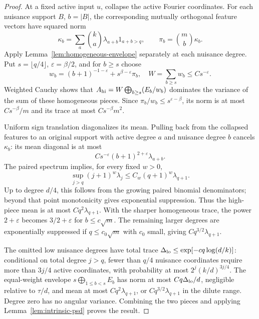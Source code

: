 \begin{proof}
At a fixed active input $u$, collapse the active Fourier coordinates.
For each nuisance support $B$, $b=|B|$, the corresponding mutually
orthogonal feature vectors have squared norm
\[
 \kappa_b=\sum_a\binom ka\lambda_{a+b}1_{a+b>q},
 \qquad \pi_b=\binom mb\kappa_b.
\]
Apply Lemma~\ref{lem:homogeneous-envelope} separately at each nuisance
degree. Put $s=\lfloor q/4\rfloor$, $\varepsilon=\beta/2$, and for
$b\ge s$ choose
\[
 w_b=(b+1)^{-1-\varepsilon}+s^{\beta-\varepsilon}\pi_b,
 \quad W=\sum_{b\ge s}w_b\le Cs^{-\varepsilon}.
\]
Weighted Cauchy shows that
$A_{\rm hi}=W\bigoplus_{b\ge s}(E_b/w_b)$ dominates the variance of
the sum of these homogeneous pieces. Since
$\pi_b/w_b\le s^{\varepsilon-\beta}$, its norm is at most
$Cs^{-\beta}/m$ and its trace at most $Cs^{-\beta}m^2$.

Uniform sign translation diagonalizes its mean. Pulling back from the
collapsed features to an original support with active degree $a$ and
nuisance degree $b$ cancels $\kappa_b$: its mean diagonal is at most
\[
 Cs^{-\varepsilon}(b+1)^{2+\varepsilon}\lambda_{a+b}.
\]
The paired spectrum implies, for every fixed $w>0$,
\[
 \sup_{j>q}(j+1)^w\lambda_j
     \le C_w(q+1)^w\lambda_{q+1}.
\]
Up to degree $d/4$, this follows from the growing paired binomial
denominators; beyond that point monotonicity gives exponential
suppression. Thus the high-piece mean is at most $Cq^2\lambda_{q+1}$.
With the sharper homogeneous trace, the power $2+\varepsilon$ becomes
$3/2+\varepsilon$ for $b\le c\sqrt m$. The remaining larger degrees
are exponentially suppressed if $q\le c_0\sqrt m$ with $c_0$ small,
giving $Cq^{3/2}\lambda_{q+1}$.

The omitted low nuisance degrees have total trace
$\Delta_{\rm lo}\le\exp[-cq\log(d/k)]$: conditional on total degree
$j>q$, fewer than $q/4$ nuisance coordinates require more than $3j/4$
active coordinates, with probability at most $2^j(k/d)^{3j/4}$.
The equal-weight envelope
$s\bigoplus_{1\le b<s}E_b$ has norm at most
$Cq\Delta_{\rm lo}/d$, negligible relative to $\tau/d$, and mean at
most $Cq^2\lambda_{q+1}$, or $Cq^{3/2}\lambda_{q+1}$ in the dilute
range. Degree zero has no angular variance. Combining the two pieces
and applying Lemma~\ref{lem:intrinsic-psd} proves the result.
\end{proof}

